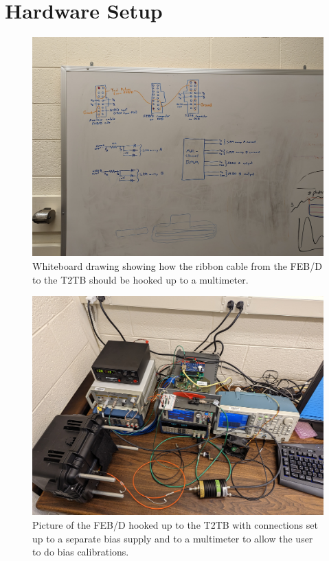 \documentclass{report}
\begin{document}
\begin{titlepage}
    
\end{titlepage}
\chapter{Hardware Setup}
\begin{figure}
\centering
\includegraphics[width=\textwidth]{tofhir2_whiteboard.jpg}
\caption{Whiteboard drawing showing how the ribbon cable from the FEB/D to the T2TB should be hooked up to a multimeter.}
\label{tofhir2_whiteboard}
\end{figure}
\begin{figure}
\centering
\includegraphics[width=\textwidth]{tofhir2_setup.jpg}
\caption{Picture of the FEB/D hooked up to the T2TB with connections set up to a separate bias supply and to a multimeter to allow the user to do bias calibrations.}
\label{tofhir2_setup}
\end{figure}
\end{document}
